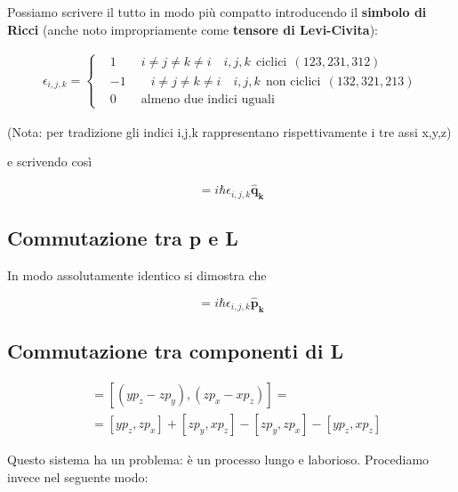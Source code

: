 Possiamo scrivere il tutto in modo più compatto introducendo il \textbf{simbolo di Ricci} (anche noto impropriamente come \textbf{tensore di Levi-Civita}):

\begin{align}
\epsilon_{i,j,k}=
\left\{\begin{array}{ccc}
{}&1 \qquad i \neq j \neq k \neq i \quad i,j,k \: \: \text{ciclici} \:\: (123,231,312) \quad \: \\
&-1 \qquad i \neq j \neq k \neq i \quad i,j,k \: \: \text{non ciclici} \:\: (132,321,213) \\
&0 \qquad \text{almeno due indici uguali} \qquad \qquad \qquad \qquad \quad
\end{array}\right. 
\end{align}

(Nota: per tradizione gli indici i,j,k rappresentano rispettivamente i tre assi x,y,z)\newline

e scrivendo così

\begin{equation}
[\mathbf{\hat q_i}, \mathbf{\hat L_j}]= i \hbar \epsilon_{i,j,k} \mathbf{\hat q_k}
\end{equation}

\subsection{Commutazione tra p e L}

In modo assolutamente identico si dimostra che

\begin{equation}
[\mathbf{\hat p_i}, \mathbf{\hat L_j}]= i \hbar \epsilon_{i,j,k} \mathbf{\hat p_k}
\end{equation}
\newpage

\subsection{Commutazione tra componenti di L}

\begin{align}
[\mathbf{\hat L_x}, \mathbf{\hat L_y} ]{}&= [ (y p_z - zp_y) , (zp_x - xp_z) ] = \nonumber \\
&= [y p_z, zp_x] + [z p_y , x p_z] - [zp_y, zp_x] - [yp_z, xp_z]
\end{align}

Questo sistema ha un problema: è un processo lungo e laborioso. Procediamo invece nel seguente modo:

